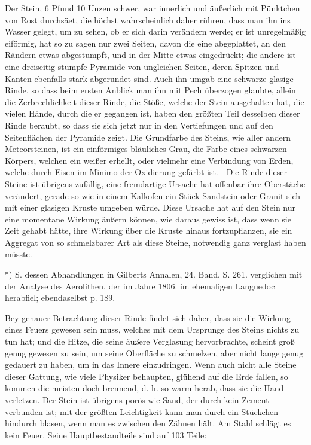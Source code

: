 \documentclass[a4paper, 11pt, oneside, polutonikogreek, german]{article}
\begin{document}
Der Stein, 6 Pfund 10 Unzen schwer, war innerlich und äußerlich mit Pünktchen von Rost durchsäet, die höchst wahrscheinlich daher rühren, dass man ihn ins Wasser gelegt, um zu sehen, ob er sich darin verändern werde; er ist unregelmäßig eiförmig, hat so zu sagen nur zwei Seiten, davon die eine abgeplattet, an den Rändern etwas abgestumpft, und in der Mitte etwas eingedrückt; die andere ist eine dreiseitig stumpfe Pyramide von ungleichen Seiten, deren Spitzen und Kanten ebenfalls stark abgerundet sind. Auch ihn umgab eine schwarze glasige Rinde, so dass beim ersten Anblick man ihn mit Pech überzogen glaubte, allein die Zerbrechlichkeit dieser Rinde, die Stöße, welche der Stein ausgehalten hat, die vielen Hände, durch die er gegangen ist, haben den größten Teil desselben dieser Rinde beraubt, so dass sie sich jetzt nur in den Vertiefungen und auf den Seitenflächen der Pyramide zeigt. Die Grundfarbe des Steins, wie aller andern Meteorsteinen, ist ein einförmiges bläuliches Grau, die Farbe eines schwarzen Körpers, welchen ein weißer erhellt, oder vielmehr eine Verbindung von Erden, welche durch Eisen im Minimo der Oxidierung gefärbt ist. - Die Rinde dieser Steine ist übrigens zufällig, eine fremdartige Ursache hat offenbar ihre Oberstäche verändert, gerade so wie in einem Kalkofen ein Stück Sandstein oder Granit sich mit einer glasigen Kruste umgeben würde. Diese Ursache hat auf den Stein nur eine momentane Wirkung äußern können, wie daraus gewiss ist, dass wenn sie Zeit gehabt hätte, ihre Wirkung über die Kruste hinaus fortzupflanzen, sie ein Aggregat von so schmelzbarer Art als diese Steine, notwendig ganz verglast haben müsste.

*) S. dessen Abhandlungen in Gilberts Annalen, 24. Band, S. 261. verglichen mit der Analyse des Aerolithen, der im Jahre 1806. im ehemaligen Languedoc herabfiel; ebendaselbst p. 189.

Bey genauer Betrachtung dieser Rinde findet sich daher, dass sie die Wirkung eines Feuers gewesen sein muss, welches mit dem Ursprunge des Steins nichts zu tun hat; und die Hitze, die seine äußere Verglasung hervorbrachte, scheint groß genug gewesen zu sein, um seine Oberfläche zu schmelzen, aber nicht lange genug gedauert zu haben, um in das Innere einzudringen. Wenn auch nicht alle Steine dieser Gattung, wie viele Physiker behaupten, glühend auf die Erde fallen, so kommen die meisten doch brennend, d. h. so warm herab, dass sie die Hand verletzen. Der Stein ist übrigens porös wie Sand, der durch kein Zement verbunden ist; mit der größten Leichtigkeit kann man durch ein Stückchen hindurch blasen, wenn man es zwischen den Zähnen hält. Am Stahl schlägt es kein Feuer. Seine Hauptbestandteile sind auf 103 Teile:
\end{document}
